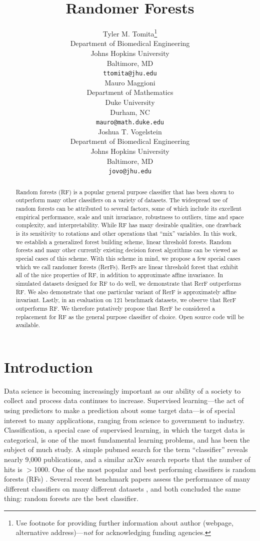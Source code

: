 \documentclass{article} %
\title{Randomer Forests}
\author{
Tyler M. Tomita\thanks{ Use footnote for providing further information
about author (webpage, alternative address)---\emph{not} for acknowledging
funding agencies.} \\
Department of Biomedical Engineering\\
Johns Hopkins University\\
Baltimore, MD \\
\texttt{ttomita@jhu.edu} \\
\And
Mauro Maggioni \\
Department of Mathematics \\
Duke University \\
Durham, NC \\
\texttt{mauro@math.duke.edu} \\
\And
Joshua T. Vogelstein \\
Department of Biomedical Engineering \\
Johns Hopkins University \\
Baltimore, MD \\
\texttt{jovo@jhu.edu} \\
}
\begin{document}
\maketitle
\vspace{-15pt}
\begin{abstract}
Random forests (RF) is a popular general purpose classifier that has been shown to outperform many other classifiers on a variety of datasets. The widespread use of random forests can be attributed to several factors, some of which include its excellent empirical performance, scale and unit invariance, robustness to outliers, time and space complexity, and interpretability. While RF has many desirable qualities, one drawback is its sensitivity to rotations and other operations that ``mix'' variables. In this work, we establish a generalized forest building scheme, linear threshold forests. Random forests and many other currently existing decision forest algorithms can be viewed as special cases of this scheme. With this scheme in mind, we propose a few special cases which we call randomer forests (RerFs). RerFs are linear threshold forest that exhibit all of the nice properties of RF, in addition to approximate affine invariance. In simulated datasets designed for RF to do well, we demonstrate that RerF outperforms RF. We also demonstrate that one particular variant of RerF is approximately affine invariant. Lastly, in an evaluation on 121 benchmark datasets, we observe that RerF outperforms RF. We therefore putatively propose that RerF be considered a replacement for RF as the general purpose classifier of choice. Open source code will be available.
\end{abstract}

\section{Introduction}

Data science is becoming increasingly important as our ability of a society to collect and process data continues to increase.  Supervised learning---the act of using predictors to make a prediction about some target data---is of special interest to many applications, ranging from science to government to industry.  Classification, a special case of supervised learning, in which the target data is categorical, is one of the most fundamental learning problems, and has been the subject of much study.  A simple pubmed search for the term ``classifier'' reveals nearly 9,000 publications, and a similar arXiv search reports that the number of hits is $>$1000.  One of the most popular and best performing classifiers is random forests (RFs) \cite{Breiman2001}.  Several recent benchmark papers assess the performance of many different classifiers on many different datasets \cite{Delgado2014,Caruana2008}, and both concluded the same thing: random forests are the best classifier.
\end{document}
